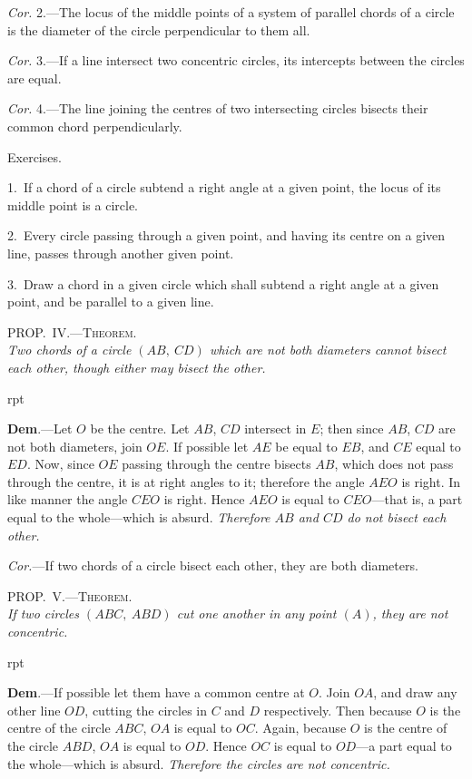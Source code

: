 \documentclass[oneside]{book}
\newcommand\myprop[2]{
\bigskip\Needspace*{4\baselineskip}\begin{center}\textsc{#1}\\\medskip\emph{#2}\par\end{center}
}
\newcommand\exhead[1]{
\Needspace*{5\baselineskip}\begin{center}
\textsf{#1}
\end{center}
}
\newcommand\imgflow[3]{
\setcounter{wrapwidth}{#1}
\begin{wrapfigure}[#2]{r}{\value{wrapwidth}pt}
\begin{center}
\vspace{-0.3in}
\end{center}
\end{wrapfigure}
}
\begin{document}
\textit{Cor.} 2.---The locus of the middle points of a system
of parallel chords of a circle is the diameter of the
circle perpendicular to them all.

\textit{Cor.} 3.---If a line intersect two concentric circles,
its intercepts between the circles are equal.

\textit{Cor.} 4.---The line joining the centres of two intersecting
circles bisects their common chord perpendicularly.


\exhead{Exercises.}

\begin{footnotesize}
1.~If a chord of a circle subtend a right angle at a given
point, the locus of its middle point is a circle.

2.~Every circle passing through a given point, and having its
centre on a given line, passes through another given point.

3.~Draw a chord in a given circle which shall subtend a right
angle at a given point, and be parallel to a given line.
\par\end{footnotesize}


\myprop{PROP\@.~IV\@.---Theorem.}{Two chords of a circle $(AB,\ CD)$ which are not both
diameters cannot bisect each other, though either may
bisect the other.}

\imgflow{115}{9}{f107}

\textbf{Dem}.---Let $O$ be the centre. Let $AB$, $CD$ intersect
in $E$; then since $AB$, $CD$ are not
both diameters, join $OE$. If possible
let $AE$ be equal to $EB$, and
$CE$ equal to $ED$. Now, since $OE$
passing through the centre bisects
$AB$, which does not pass through
the centre, it is at right angles to
it; therefore the angle $AEO$ is
right. In like manner the angle
$CEO$ is right. Hence $AEO$ is equal to $CEO$---that is,
a part equal to the whole---which is absurd. \textit{Therefore
$AB$ and $CD$ do not bisect each other.}

\textit{Cor.}---If two chords of a circle bisect each other,
they are both diameters.


\myprop{PROP\@.~V.---Theorem.}{If two circles $(ABC,\ ABD)$ cut one another in any point
$(A)$, they are not concentric.}

\imgflow{118}{8}{f108}

\textbf{Dem}.---If possible let them have a common centre at
$O$. Join $OA$, and draw any other
line $OD$, cutting the circles in $C$
and $D$ respectively. Then because
$O$ is the centre of the circle $ABC$,
$OA$ is equal to $OC$. Again, because
$O$ is the centre of the circle
$ABD$, $OA$ is equal to $OD$. Hence
$OC$ is equal to $OD$---a part equal
to the whole---which is absurd.
\emph{Therefore the circles
are not concentric.}
\end{document}
